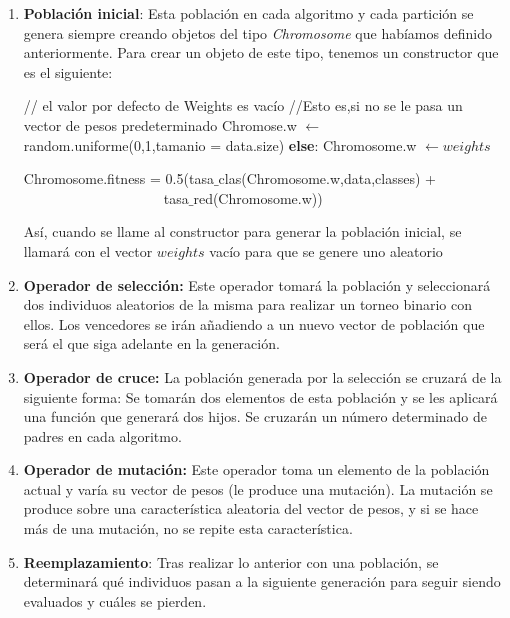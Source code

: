 \documentclass[11pt]{article}
\begin{document}
\begin{enumerate}
	\item \textbf{Población inicial}: Esta población en cada algoritmo y cada partición se genera siempre creando objetos del tipo \emph{Chromosome} que habíamos definido anteriormente. Para crear un objeto de este tipo, tenemos un constructor que es el siguiente:
	\begin{algorithmic}[1]
\State // el valor por defecto de Weights es vacío
 //Esto es,si no se le pasa un vector de pesos predeterminado
\State Chromose.w $\gets$ random.uniforme(0,1,tamanio = data.size)
\EndIf
\State \textbf{else}: Chromosome.w $\gets weights$

\State Chromosome.fitness = 0.5(tasa$\_$clas(Chromosome.w,data,classes) + 
\State $\quad \quad \quad \quad \quad \quad \quad \quad \quad \quad$tasa$\_$red(Chromosome.w))

\EndProcedure
\end{algorithmic}
Así, cuando se llame al constructor para generar la población inicial, se llamará con el vector $weights$ vacío para que se genere uno aleatorio

\item \textbf{Operador de selección:} Este operador tomará la población y seleccionará dos individuos aleatorios de la misma para realizar un torneo binario con ellos. Los vencedores se irán añadiendo a un nuevo vector de población que será el que siga adelante en la generación.

\item \textbf{Operador de cruce:} La población generada por la selección se cruzará de la siguiente forma: Se tomarán dos elementos de esta población y se les aplicará una función que generará dos hijos. Se cruzarán un número determinado de padres en cada algoritmo. 

\item \textbf{Operador de mutación:} Este operador toma un elemento de la población actual y varía su vector de pesos (le produce una mutación). La mutación se produce sobre una característica aleatoria del vector de pesos, y si se hace más de una mutación, no se repite esta característica.

\item \textbf{Reemplazamiento}: Tras realizar lo anterior con una población, se determinará qué individuos pasan a la siguiente generación para seguir siendo evaluados y cuáles se pierden.
\end{enumerate}
\end{document}
